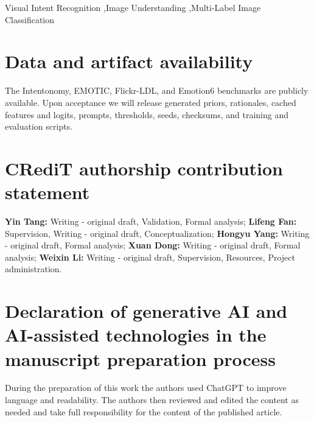 \documentclass[times,review,10pt]{elsarticle}
\begin{document}
\begin{frontmatter}
\begin{keyword}
Visual Intent Recognition \sep Image Understanding \sep Multi-Label Image Classification


\end{keyword}

\end{frontmatter}










\section*{Data and artifact availability}
The Intentonomy, EMOTIC, Flickr-LDL, and Emotion6 benchmarks are publicly available. Upon acceptance we will release generated priors, rationales, cached features and logits, prompts, thresholds, seeds, checksums, and training and evaluation scripts.

\section*{CRediT authorship contribution statement}
\textbf{Yin Tang:} Writing - original draft, Validation, Formal analysis; \textbf{Lifeng Fan:} Supervision, Writing - original draft, Conceptualization; \textbf{Hongyu Yang:} Writing - original draft, Formal analysis; \textbf{Xuan Dong:} Writing - original draft, Formal analysis; \textbf{Weixin Li:} Writing - original draft, Supervision, Resources, Project administration.


\section*{Declaration of generative AI and AI-assisted technologies in the manuscript preparation process}
During the preparation of this work the authors used ChatGPT to improve language and readability. The authors then reviewed and edited the content as needed and take full responsibility for the content of the published article.
\end{document}
